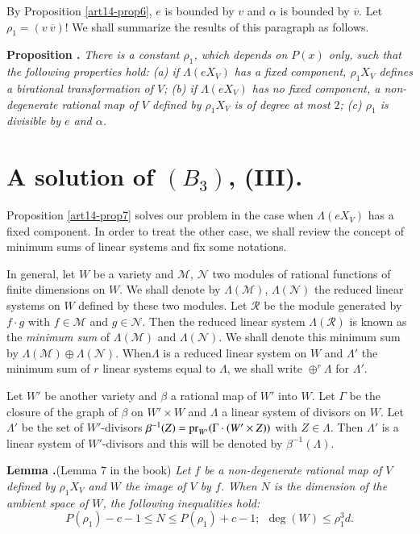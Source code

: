 By Proposition \ref{art14-prop6}, $e$ is bounded by $v$ and $\alpha$ is bounded by $\overline{v}$. Let $\rho_{1}=(v \ \overline{v})$! We shall summarize the results of this paragraph as follows.

\medskip
\noindent
{\bf Proposition .\label{art14-prop7}}
{\em There is a constant $\rho_{1}$, which depends on $P(x)$ only, such that the following properties hold: {\rm(a)} if $\Lambda(eX_{V})$ has a fixed component, $\rho_{1}X_{V}$ defines a birational transformation of $V$; {\rm(b)} if $\Lambda(eX_{V})$ has no fixed component, a non-degenerate rational map of $V$ defined by $\rho_{1}X_{V}$ is of degree at most $2$; {\rm(c)} $\rho_{1}$ is divisible by $e$ and $\alpha$.}

\section{A solution of \texorpdfstring{$(B_{3})$}{B3}, (III).}\label{art14-sec7}

Proposition \ref{art14-prop7} solves our problem in the case when $\Lambda(eX_{V})$ has a fixed component. In order to treat the other case, we shall review the concept of minimum sums of linear systems and fix some notations.

In general, let $W$ be a variety and $\mathscr{M}$, $\mathscr{N}$ two modules of rational functions of finite dimensions on $W$. We shall denote by $\Lambda(\mathscr{M})$, $\Lambda(\mathscr{N})$ the reduced linear systems on $W$ defined by these two modules. Let $\mathscr{R}$ be the module generated by $f\cdot g$ with $f\in \mathscr{M}$ and $g\in \mathscr{N}$. Then the reduced linear system $\Lambda(\mathscr{R})$ is known as the {\em minimum sum} of $\Lambda(\mathscr{M})$ and $\Lambda(\mathscr{N})$. We shall denote this minimum sum by $\Lambda(\mathscr{M})\oplus \Lambda(\mathscr{N})$. When\pageoriginale $\Lambda$ is a reduced linear system on $W$ and $\Lambda'$ the minimum sum of $r$ linear systems equal to $\Lambda$, we shall write $\oplus^{r}\Lambda$ for $\Lambda'$.

Let $W'$ be another variety and $\beta$ a rational map of $W'$ into $W$. Let $\Gamma$ be the closure of the graph of $\beta$ on $W'\times W$ and $\Lambda$ a linear system of divisors on $W$. Let $\Lambda'$ be the set of $W'$-divisors $\beta^{-1}(Z)=\operatorname{\mathrm{pr}}_{W'}(\Gamma\cdot (W'\times Z))$ with $Z\in \Lambda$. Then $\Lambda'$ is a linear system of $W'$-divisors and this will be denoted by $\beta^{-1}(\Lambda)$.

\medskip
\noindent
{\bf Lemma .\label{art14-lem8}}(Lemma 7 in the book)
{\em Let $f$ be a non-degenerate rational map of $V$ defined by $\rho_{1}X_{V}$ and $W$ the image of $V$ by $f$. When $N$ is the dimension of the ambient space of $W$, the following inequalities hold:}
$$
P(\rho_{1})-c-1\leq N\leq P(\rho_{1})+c-1; \ \ \deg(W)\leq \rho^{3}_{1}d.
$$

